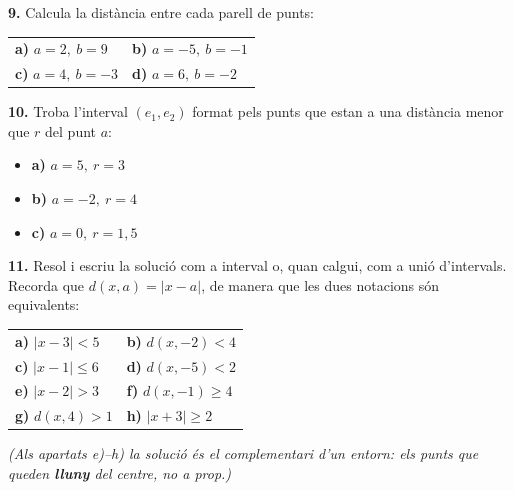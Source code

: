 \documentclass[13pt,a4paper]{extarticle}
\begin{document}
\par\noindent\begin{minipage}{\linewidth}
\textbf{9.} Calcula la distància entre cada parell de punts:\par

\begin{tabular}{@{}p{.46\linewidth}p{.46\linewidth}@{}}
\textbf{a)} $a=2,\ b=9$ & \textbf{b)} $a=-5,\ b=-1$ \\[2pt]
\textbf{c)} $a=4,\ b=-3$ & \textbf{d)} $a=6,\ b=-2$ \\[2pt]
\end{tabular}\par
\end{minipage}\par\vspace{1.6mm}
\par\noindent\begin{minipage}{\linewidth}
\textbf{10.} Troba l'interval $\left(e_1,e_2\right)$ format pels punts que estan a una distància menor que $r$ del punt $a$:\par

\begin{itemize}[leftmargin=0pt,itemsep=3pt,topsep=3pt,parsep=0pt,label={}]
\item \textbf{a)} $a=5,\ r=3$
\item \textbf{b)} $a=-2,\ r=4$
\item \textbf{c)} $a=0,\ r=1{,}5$
\end{itemize}
\end{minipage}\par\vspace{1.6mm}
\par\noindent\begin{minipage}{\linewidth}
\textbf{11.} Resol i escriu la solució com a interval o, quan calgui, com a unió d'intervals. Recorda que $d\left(x,a\right)=|x-a|$, de manera que les dues notacions són equivalents:\par

\begin{tabular}{@{}p{.46\linewidth}p{.46\linewidth}@{}}
\textbf{a)} $\lvert x-3\rvert<5$ & \textbf{b)} $d\left(x,-2\right)<4$ \\[2pt]
\textbf{c)} $\lvert x-1\rvert\leq 6$ & \textbf{d)} $d\left(x,-5\right)<2$ \\[2pt]
\textbf{e)} $\lvert x-2\rvert>3$ & \textbf{f)} $d\left(x,-1\right)\geq 4$ \\[2pt]
\textbf{g)} $d\left(x,4\right)>1$ & \textbf{h)} $\lvert x+3\rvert\geq 2$ \\[2pt]
\end{tabular}\par

\emph{(Als apartats e)–h) la solució és el complementari d'un entorn: els punts que queden \textbf{lluny} del centre, no a prop.)}\par
\end{minipage}\par\vspace{1.6mm}
\end{document}
